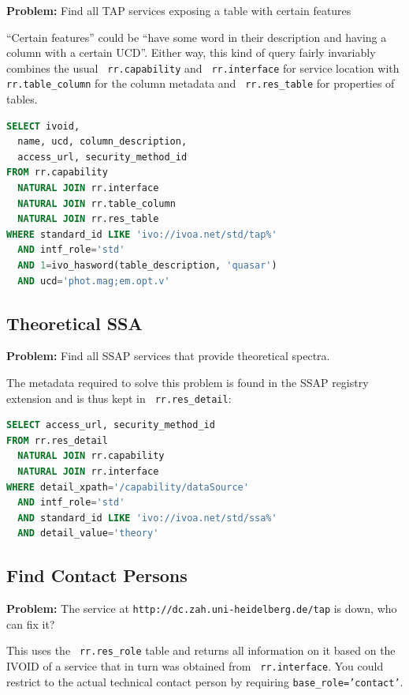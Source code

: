 \documentclass[11pt,a4paper]{ivoa}
\newcommand{\rtent}[1]{\texttt{\color{rtcolor} #1}}
\begin{document}
\textbf{Problem:} Find all TAP services
exposing a table with certain features

``Certain features'' could be ``have some word in their description
and having a column with a certain UCD''.  Either way, this kind of query
fairly invariably combines the usual 
\rtent{rr.capability} and 
\rtent{rr.interface}
 for service location with
\rtent{rr.table\_column}
 for the column metadata
and 
\rtent{rr.res\_table} for properties of tables.


\begin{lstlisting}[language=SQL,flexiblecolumns=true]
SELECT ivoid, 
  name, ucd, column_description,
  access_url, security_method_id
FROM rr.capability 
  NATURAL JOIN rr.interface
  NATURAL JOIN rr.table_column
  NATURAL JOIN rr.res_table
WHERE standard_id LIKE 'ivo://ivoa.net/std/tap%'
  AND intf_role='std'
  AND 1=ivo_hasword(table_description, 'quasar')
  AND ucd='phot.mag;em.opt.v'
\end{lstlisting}

\subsection{Theoretical SSA}

\textbf{Problem:} Find all SSAP services that
provide theoretical spectra.

The metadata required to solve this problem is found in the SSAP
registry extension and is thus kept in 
\rtent{rr.res\_detail}:


\begin{lstlisting}[language=SQL,flexiblecolumns=true]
SELECT access_url, security_method_id
FROM rr.res_detail 
  NATURAL JOIN rr.capability 
  NATURAL JOIN rr.interface 
WHERE detail_xpath='/capability/dataSource' 
  AND intf_role='std'
  AND standard_id LIKE 'ivo://ivoa.net/std/ssa%'
  AND detail_value='theory'
\end{lstlisting}


\subsection{Find Contact Persons}

\textbf{Problem:} The service at
\texttt{http://dc.zah.uni-heidelberg.de/tap} is down, who can
fix it?

This uses the \rtent{rr.res\_role} table and returns all information on
it based on the IVOID of a service that in turn was obtained from
\rtent{rr.interface}.  You could restrict to the actual technical
contact person by requiring \texttt{base\_role='contact'}.
\end{document}
